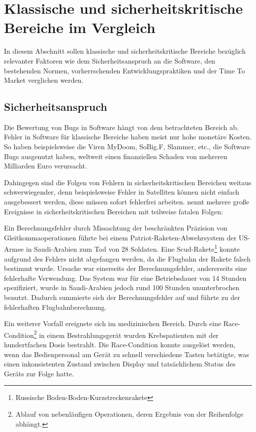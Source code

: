 \section{Klassische und sicherheitskritische Bereiche im Vergleich} \label{sec:bereiche} %

In diesem Abschnitt sollen klassische und sicherheitskritische Bereiche bezüglich relevanter Faktoren wie dem Sicherheitsanspruch an die Software, den bestehenden Normen, vorherrschenden Entwicklungspraktiken und der Time To Market verglichen werden.

\subsection{Sicherheitsanspruch} %

Die Bewertung von Bugs in Software hängt von dem betrachteten Bereich ab.
Fehler in Software für klassische Bereiche haben meist nur hohe monetäre Kosten.
So haben beispielsweise die Viren MyDoom, SoBig.F, Slammer, etc., die Software Bugs ausgenutzt haben, weltweit einen finanziellen Schaden von mehreren Milliarden Euro verursacht. \parencite[Vgl.][]{ComputerEconomics2004aa}

Dahingegen sind die Folgen von Fehlern in sicherheitskritischen Bereichen weitaus schwerwiegender, denn beispielsweise Fehler in Satelliten können nicht einfach ausgebessert werden, diese müssen sofort fehlerfrei arbeiten.
\parencite[][S. 87 - 89]{Zhivich:2009aa} nennt mehrere große Ereignisse in sicherheitskritischen Bereichen mit teilweise fatalen Folgen:

Ein Berechnungsfehler durch Missachtung der beschränkten Präzision von Gleitkommaoperationen führte bei einem Patriot-Raketen-Abwehrsystem der US-Armee in Saudi-Arabien zum Tod von 28 Soldaten.
Eine Scud-Rakete\footnote{Russische Boden-Boden-Kurzstreckenrakete} konnte aufgrund des Fehlers nicht abgefangen werden, da die Flugbahn der Rakete falsch bestimmt wurde.
Ursache war einerseits der Berechnungsfehler, andererseits eine fehlerhafte Verwendung.
Das System war für eine Betriebsdauer von 14 Stunden spezifiziert, wurde in Saudi-Arabien jedoch rund 100 Stunden ununterbrochen benutzt.
Dadurch summierte sich der Berechnungsfehler auf und führte zu der fehlerhaften Flugbahnberechnung.

Ein weiterer Vorfall ereignete sich im medizinischen Bereich.
Durch eine Race-Condition\footnote{Ablauf von nebenläufigen Operationen, deren Ergebnis von der Reihenfolge abhängt.} in einem Bestrahlungsgerät wurden Krebspatienten mit der hundertfachen Dosis bestrahlt.
Die Race-Condition konnte ausgelöst werden, wenn das Bedienpersonal am Gerät zu schnell verschiedene Tasten betätigte, was einen inkonsistenten Zustand zwischen Display und tatsächlichem Status des Geräts zur Folge hatte.

